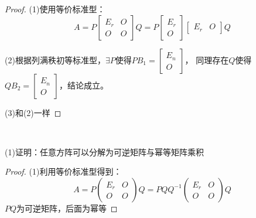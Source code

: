 \begin{proof}
  (1)使用等价标准型：
  \begin{equation*}
    A = P \left[\begin{array}{cc}
                  E_r&O\\
                  O&O
                \end{array}
              \right]Q = P \left[
                \begin{array}{c}
                  E_r\\
                  O
                \end{array}
              \right] \left[
                \begin{array}{cc}
                  E_r&O
                \end{array}
              \right]Q
            \end{equation*}

            (2)根据列满秩初等标准型，$\exists P$使得$PB_1 =  \left[
              \begin{array}{c}
                E_n\\
                O
              \end{array}
            \right]$，
            同理存在$Q$使得$Q B_2 = \left[
              \begin{array}{c}
                E_n\\
                O
              \end{array}
            \right]$，结论成立。

            (3)和(2)一样
\end{proof}

~

\begin{exercise}[幂等矩阵分解]
  (1)证明：任意方阵可以分解为可逆矩阵与幂等矩阵乘积
\end{exercise}

\begin{proof}
  (1)利用等价标准型得到：
  \begin{equation*}
    A = P \left(
      \begin{array}{cc}
        E_r&O\\
        O&O
      \end{array}
    \right)Q = PQ Q^{-1} \left(
      \begin{array}{cc}
        E_r&O\\
        O&O
      \end{array}
    \right) Q
  \end{equation*}
  $PQ$为可逆矩阵，后面为幂等
\end{proof}


